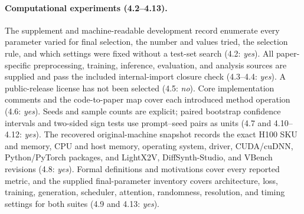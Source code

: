 \documentclass[letterpaper]{article}
\begin{document}
\paragraph{Computational experiments (4.2--4.13).}
The supplement and machine-readable development record enumerate every
parameter varied for final selection, the number and values tried, the
selection rule, and which settings were fixed without a test-set search (4.2:
\emph{yes}).  All paper-specific preprocessing, training, inference,
evaluation, and analysis sources are supplied and pass the included
internal-import closure check (4.3--4.4: \emph{yes}).  A public-release license
has not been selected (4.5: \emph{no}).  Core implementation comments and the
code-to-paper map cover each introduced method operation (4.6: \emph{yes}).
Seeds and sample counts are explicit;
paired bootstrap confidence intervals and two-sided sign tests use
prompt--seed pairs as units (4.7 and 4.10--4.12: \emph{yes}).  The recovered
original-machine snapshot records the exact H100 SKU and memory, CPU and host
memory, operating system, driver, CUDA/cuDNN, Python/PyTorch packages, and
LightX2V, DiffSynth-Studio, and VBench revisions (4.8: \emph{yes}).
Formal definitions and motivations cover every reported
metric, and the supplied final-parameter inventory covers architecture, loss,
training, generation, scheduler, attention, randomness, resolution, and timing
settings for both suites (4.9 and 4.13: \emph{yes}).
\end{document}
